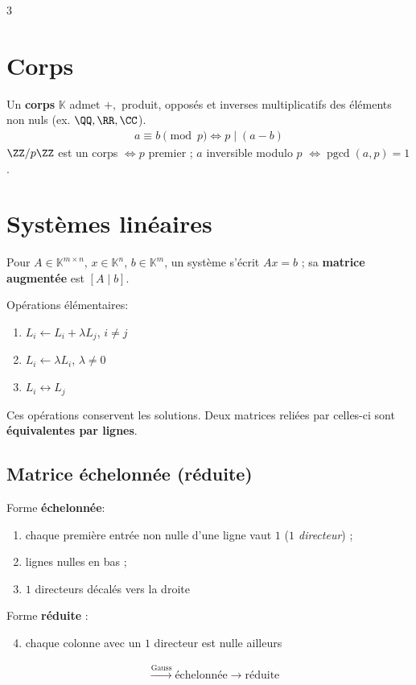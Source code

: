 \documentclass[12pt, a4paper]{article}
\newcommand{\KK}{\mathbb{K}}
\begin{document}
\begin{multicols*}{3}
\section{Corps}
Un \textbf{corps} $\KK$ admet $+,$ produit, opposés et inverses multiplicatifs des éléments non nuls (ex. $\QQ,\RR,\CC$).
\begin{align*}
a\equiv b\pmod p\iff p\mid(a-b)
\end{align*}
$\ZZ/p\ZZ$ est un corps $\iff p$ premier ; $a$ inversible modulo $p$ $\iff\operatorname{pgcd}(a,p)=1$.\\

\colbreak
\section{Systèmes linéaires}
Pour $A\in\KK^{m\times n}$, $x\in\KK^n$, $b\in\KK^m$, un système s'écrit $Ax=b$ ; sa \textbf{matrice augmentée} est $[A\mid b]$.

Opérations élémentaires:
\begin{enumerate}
\item $L_i\leftarrow L_i+\lambda L_j$, $i\ne j$
\item $L_i\leftarrow\lambda L_i$, $\lambda\ne0$
\item $L_i\leftrightarrow L_j$
\end{enumerate}
Ces opérations conservent les solutions. Deux matrices reliées par celles-ci sont \textbf{équivalentes par lignes}.

\subsection{Matrice échelonnée (réduite)}
Forme \textbf{échelonnée}:
\begin{enumerate}
\item chaque première entrée non nulle d'une ligne vaut $1$ (\emph{$1$ directeur}) ;
\item lignes nulles en bas ;
\item $1$ directeurs décalés vers la droite
\end{enumerate}
Forme \textbf{réduite} : 
\begin{enumerate}
  \setcounter{enumi}{3}
  \item chaque colonne avec un $1$ directeur est nulle ailleurs
\end{enumerate}
\begin{align*}
[A\mid b]&\xrightarrow{\text{Gauss}}\text{échelonnée}\xrightarrow{}\text{réduite}
\end{align*}


\end{multicols*}
\end{document}
